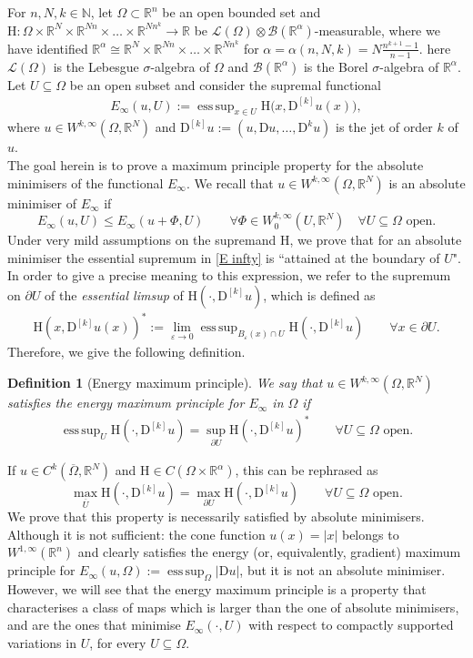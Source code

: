 \documentclass[a4paper,11pt]{article}
\numberwithin{equation}{section}
\newtheorem{Definition}[Theorem]{Definition}
\newcommand{\numberset}{\mathbb}
\newcommand{\eps}{\varepsilon}
\newcommand{\N}{\numberset{N}}
\newcommand{\Om}{\Omega}
\newcommand{\R}{\numberset{R}}
\newcommand{\rom}{\mathrm}
\DeclareMathOperator*{\esssup}{ess\,sup}
\theoremstyle{definition}
\begin{document}
For $n,N,k\in\N$,
 let $\Om\subset\R^n$ be an open bounded set and $\rom{H}:\Om\times\R^N\times\R^{Nn}
\times\ldots\times\R^{Nn^k}\to\R$ be $\mathscr{L}(\Om)\otimes\mathscr{B}(\R^\alpha)$-measurable, where we have identified $\R^\alpha\cong\R^N\times\R^{Nn}\times\ldots\times\R^{Nn^k}$ for $\alpha=\alpha(n,N,k)=N\frac{n^{k+1}-1}{n-1}$. here $\mathscr{L}(\Om)$ is the Lebesgue $\sigma$-algebra of $\Om$ and $\mathscr{B}(\R^\alpha)$ is the Borel $\sigma$-algebra of $\R^\alpha$. Let $U\subseteq\Om$ be an open subset and consider the supremal functional
\begin{align}\label{E infty}
E_{\infty}(u, U):=\esssup_{x\in U}\rom{H}\big(x, \mathrm D ^{[k]}u(x)\big),
\end{align}
where $u\in W^{k,\infty}(\Om,\R^N)$
and $\mathrm D^{[k]} u:=(u,\mathrm Du,\ldots, \mathrm D^ku)$ is the jet of order $k$ of $u$. \\
The goal herein is to prove a maximum principle property for the absolute minimisers of the functional $E_\infty$. We recall that $u\in W^{k,\infty}(\Om,\R^N)$ is an absolute minimiser of $E_\infty$ if 
$$
E_\infty(u,U)\leq E_\infty (u+\Phi,U)\qquad\forall \Phi\in W^{k,\infty}_0(U,\R^N)\quad\forall U\subseteq\Om \mbox{ open}.
$$
Under very mild assumptions on the supremand $\rom{H}$, we prove that for an absolute minimiser the essential supremum in \eqref{E infty} is ``attained at the boundary of $U$". In order to give a precise meaning to this expression, we refer to the supremum on $\partial U$ of the \textit{essential limsup} of $\rom{H}(\cdot, \mathrm D ^{[k]}u)$, which is defined as
\begin{align}\label{rep}
\rom{H}(x,\mathrm D ^{[k]}u(x))^*:=\lim_{\eps\to 0}\esssup_{B_\eps(x)\cap U}\rom{H}(\cdot,\mathrm D ^{[k]}u)\qquad\forall x\in \partial U.
\end{align}
Therefore, we give the following definition.
\begin{Definition}[Energy maximum principle]
We say that $u\in W^{k,\infty}(\Om,\R^N)$ satisfies the energy maximum principle for $E_\infty$ in $\Om$ if
\begin{align}\label{MP}
\esssup_U \rom{H}(\cdot, \mathrm D ^{[k]}u)=\sup_{\partial U}\rom{H}(\cdot,\mathrm D ^{[k]}u)^*\qquad\forall U\subseteq\Om \mbox{ open}.
\end{align}
\end{Definition}
\noindent
If $u\in C^k(\overline\Om,\R^N)$ and $\rom{H}\in C(\Om\times\R^\alpha)$, this can be rephrased as
$$
\max_{\overline U} \rom{H}(\cdot, \mathrm D ^{[k]}u)=\max_{\partial U}\rom{H}(\cdot,\mathrm D ^{[k]}u)\qquad\forall U\subseteq\Om \mbox{ open}.
$$
We prove that this property is necessarily satisfied by absolute minimisers. Although it is not sufficient: the cone function $u(x)=|x|$ belongs to $W^{1,\infty}(\R^n)$ and clearly satisfies the energy (or, equivalently, gradient) maximum principle for $E_\infty(u,\Om):=\esssup_\Om|\mathrm Du|$, but it is not an absolute minimiser. However, we will see that the energy maximum principle is a property that characterises a class of maps which is larger than the one of absolute minimisers, and are the ones that minimise $E_\infty(\cdot,U)$ with respect to compactly supported variations in $U$, for every $U\subseteq\Om$.
\end{document}
